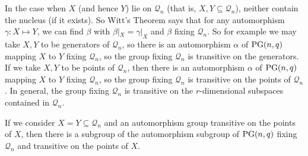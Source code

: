 \documentclass[12pt]{article}
\newcommand{\Q}{\mathscr Q}
\newcommand\PG{{\rm PG}}
\begin{document}
In the case when $X$ (and hence $Y$) lie on $\Q_n$ (that is, $X,Y\subseteq \Q_n$), neither contain the nucleus (if it exists). So Witt's Theorem says that for any automorphism $\gamma\colon X\mapsto Y$, we can find $\beta$  with   $\beta|_X=\gamma|_X$ and $\beta$ fixing $\Q_n$.  So for example we may take $X,Y$ to be generators of $\Q_n$, so there is an automorphism $\alpha$ of $\PG(n,q)$ mapping $X$ to $Y$ fixing $\Q_n$, so the group fixing $\Q_n$ is transitive on the generators.  If we take $X,Y$ to be points of $\Q_n$, then there is an automorphism  $\alpha$ of $\PG(n,q)$ mapping $X$ to $Y$ fixing $\Q_n$, so the group fixing $\Q_n$ is transitive on the points of $\Q_n$.  In general, the group fixing $\Q_n$ is transitive on the $r$-dimensional subspaces contained in $\Q_n$.  

If we consider $X=Y\subseteq\Q_n$ and an automorphism group transitive on the points of $X$, then there is a subgroup of the automorphism subgroup of $\PG(n,q)$ fixing $\Q_n$ and transitive on the points of $X$. 
\end{document}
